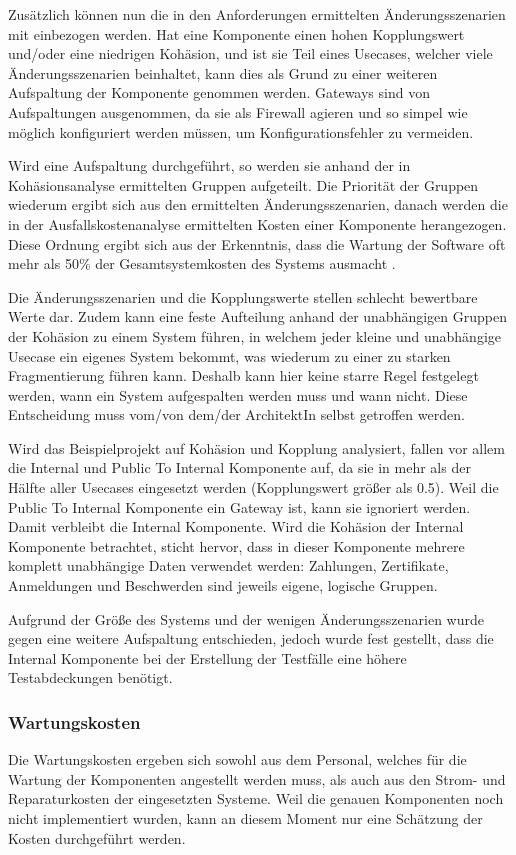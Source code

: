 Zusätzlich können nun die in den Anforderungen ermittelten Änderungsszenarien mit einbezogen werden. Hat eine Komponente einen hohen Kopplungswert und/oder eine niedrigen Kohäsion, und ist sie Teil eines Usecases, welcher viele Änderungsszenarien beinhaltet, kann dies als Grund zu einer weiteren Aufspaltung der Komponente genommen werden. Gateways sind von Aufspaltungen ausgenommen, da sie als Firewall agieren und so simpel wie möglich konfiguriert werden müssen, um Konfigurationsfehler zu vermeiden.

Wird eine Aufspaltung durchgeführt, so werden sie anhand der in Kohäsionsanalyse ermittelten Gruppen aufgeteilt. Die Priorität der Gruppen wiederum ergibt sich aus den ermittelten Änderungsszenarien, danach werden die in der Ausfallskostenanalyse ermittelten Kosten einer Komponente herangezogen. Diese Ordnung ergibt sich aus der Erkenntnis, dass die Wartung der Software oft mehr als 50\% der Gesamtsystemkosten des Systems ausmacht \cite[S. 71-84]{maincost}.

Die Änderungsszenarien und die Kopplungswerte stellen schlecht bewertbare Werte dar. Zudem kann eine feste Aufteilung anhand der unabhängigen Gruppen der Kohäsion zu einem System führen, in welchem jeder kleine und unabhängige Usecase ein eigenes System bekommt, was wiederum zu einer zu starken Fragmentierung führen kann. Deshalb kann hier keine starre Regel festgelegt werden, wann ein System aufgespalten werden muss und wann nicht. Diese Entscheidung muss vom/von dem/der ArchitektIn selbst getroffen werden.

Wird das Beispielprojekt auf Kohäsion und Kopplung analysiert, fallen vor allem die Internal und Public To Internal Komponente auf, da sie in mehr als der Hälfte aller Usecases eingesetzt werden (Kopplungswert größer als 0.5). Weil die Public To Internal Komponente ein Gateway ist, kann sie ignoriert werden. Damit verbleibt die Internal Komponente. Wird die Kohäsion der Internal Komponente betrachtet, sticht hervor, dass in dieser Komponente mehrere komplett unabhängige Daten verwendet werden: Zahlungen, Zertifikate, Anmeldungen und Beschwerden sind jeweils eigene, logische Gruppen.

Aufgrund der Größe des Systems und der wenigen Änderungsszenarien wurde gegen eine weitere Aufspaltung entschieden, jedoch wurde fest gestellt, dass die Internal Komponente bei der Erstellung der Testfälle eine höhere Testabdeckungen benötigt.

\subsubsection{Wartungskosten}
Die Wartungskosten ergeben sich sowohl aus dem Personal, welches für die Wartung der Komponenten angestellt werden muss, als auch aus den Strom- und Reparaturkosten der eingesetzten Systeme. Weil die genauen Komponenten noch nicht implementiert wurden, kann an diesem Moment nur eine Schätzung der Kosten durchgeführt werden.

